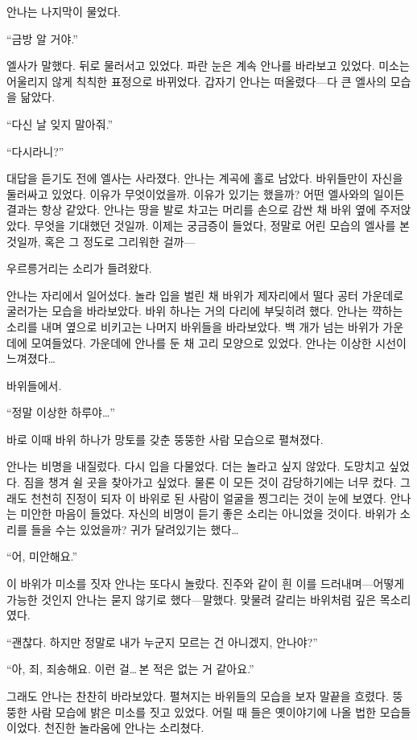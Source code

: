 안나는 나지막이 물었다.

``금방 알 거야.''

엘사가 말했다. 뒤로 물러서고 있었다. 파란 눈은 계속 안나를 바라보고 있었다. 미소는 어울리지 않게 칙칙한 표정으로 바뀌었다. 갑자기 안나는 떠올렸다—다 큰 엘사의 모습을 닮았다.

``다신 날 잊지 말아줘.''

``다시라니?''

대답을 듣기도 전에 엘사는 사라졌다. 안나는 계곡에 홀로 남았다. 바위들만이 자신을 둘러싸고 있었다. 이유가 무엇이었을까. 이유가 있기는 했을까? 어떤 엘사와의 일이든 결과는 항상 같았다. 안나는 땅을 발로 차고는 머리를 손으로 감싼 채 바위 옆에 주저앉았다. 무엇을 기대했던 것일까. 이제는 궁금증이 들었다, 정말로 어린 모습의 엘사를 본 것일까, 혹은 그 정도로 그리워한 걸까—

우르릉거리는 소리가 들려왔다.

안나는 자리에서 일어섰다. 놀라 입을 벌린 채 바위가 제자리에서 떨다 공터 가운데로 굴러가는 모습을 바라보았다. 바위 하나는 거의 다리에 부딪히려 했다. 안나는 꺅하는 소리를 내며 옆으로 비키고는 나머지 바위들을 바라보았다. 백 개가 넘는 바위가 가운데에 모여들었다. 가운데에 안나를 둔 채 고리 모양으로 있었다. 안나는 이상한 시선이 느껴졌다\ldots

바위들에서.

``정말 이상한 하루야\ldots''

바로 이때 바위 하나가 망토를 갖춘 뚱뚱한 사람 모습으로 펼쳐졌다.

안나는 비명을 내질렀다. 다시 입을 다물었다. 더는 놀라고 싶지 않았다. 도망치고 싶었다. 짐을 챙겨 쉴 곳을 찾아가고 싶었다. 물론 이 모든 것이 감당하기에는 너무 컸다. 그래도 천천히 진정이 되자 이 바위로 된 사람이 얼굴을 찡그리는 것이 눈에 보였다. 안나는 미안한 마음이 들었다. 자신의 비명이 듣기 좋은 소리는 아니었을 것이다. 바위가 소리를 들을 수는 있었을까? 귀가 달려있기는 했다\ldots

``어, 미안해요.''

이 바위가 미소를 짓자 안나는 또다시 놀랐다. 진주와 같이 흰 이를 드러내며—어떻게 가능한 것인지 안나는 묻지 않기로 했다—말했다. 맞물려 갈리는 바위처럼 깊은 목소리였다.

``괜찮다. 하지만 정말로 내가 누군지 모르는 건 아니겠지, 안나야?''

``아, 죄, 죄송해요. 이런 걸\ldots\,본 적은 없는 거 같아요.''

그래도 안나는 찬찬히 바라보았다. 펼쳐지는 바위들의 모습을 보자 말끝을 흐렸다. 뚱뚱한 사람 모습에 밝은 미소를 짓고 있었다. 어릴 때 들은 옛이야기에 나올 법한 모습들이었다. 천진한 놀라움에 안나는 소리쳤다.

